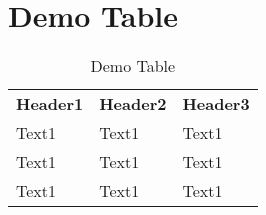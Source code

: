 \documentclass[11.5pt]{article}
\begin{document}
\section{Demo Table}
\begin{table}[h!]
  \small
  \centering
  \caption{Demo Table}
  {
    \renewcommand{\arraystretch}{2} \footnotesize
    \begin{tabular}
      {p{2cm}p{2cm}>{\raggedright\arraybackslash}p{2.5cm}}
      \\\toprule
      \textbf{Header1}                            &
      \textbf{Header2}                            &
      \textbf{Header3}\\
      \cmidrule(lr){1-2} %
      \begin{minipage}{
          .5\textwidth}{\color{medium-blue} Text1}
      \end{minipage} &
      \begin{minipage}{
          .5\textwidth}{\color{medium-blue} Text1}
      \end{minipage} &
      \begin{minipage}{
          .5\textwidth}{\color{medium-blue} Text1}
      \end{minipage}\\
      
      \begin{minipage}{
          .5\textwidth}{\color{medium-blue} Text1}
      \end{minipage} &
      \begin{minipage}{
          .5\textwidth}{\color{medium-blue} Text1}
      \end{minipage} &
      \begin{minipage}{
          .5\textwidth}{\color{purple} Text1}
      \end{minipage}\\
      \cmidrule(lr){2-3} %
      \begin{minipage}{
          .5\textwidth}{\color{medium-blue} Text1}
      \end{minipage} &
      \begin{minipage}{
          .5\textwidth}{\color{medium-blue} Text1}
      \end{minipage} &
      \begin{minipage}{
          .5\textwidth}{\color{purple} Text1}
      \end{minipage}\\
      \bottomrule%
    \end{tabular}
  }
  \label{table:querycomplexity}
\end{table}
\end{document}
